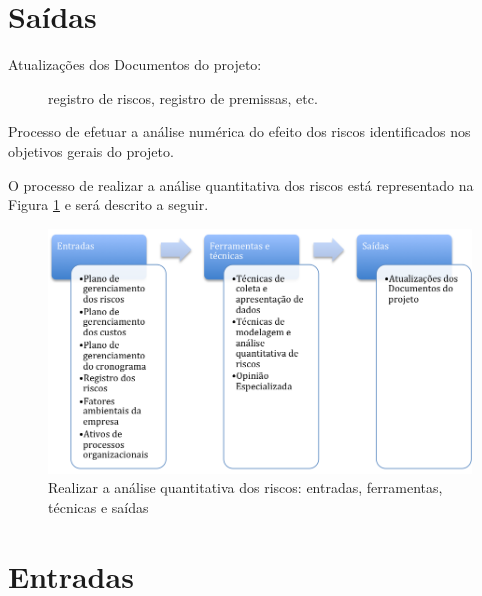 \section{Saídas}

\begin{description}
	
	\item[Atualizações dos Documentos do projeto:] registro de riscos, registro de premissas, etc.
	
\end{description}


Processo de efetuar a análise numérica do efeito dos riscos identificados nos objetivos gerais do projeto.

O processo de realizar a análise quantitativa dos riscos está representado na Figura \ref{fig:riscos:analise:quant:efts} e será descrito a seguir.

\begin{figure}[!h]
	\centering
	\includegraphics[scale=0.5]{Figuras/riscos_efts_analise_quant.png}
	\caption{Realizar a análise quantitativa dos riscos: entradas, ferramentas, técnicas e saídas}
	\label{fig:riscos:analise:quant:efts}
\end{figure}

\section{Entradas}

